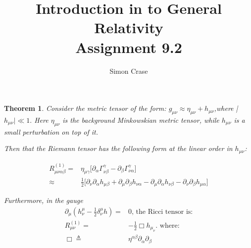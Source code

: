 \documentclass[]{article}
\title{Introduction in to General Relativity\\Assignment 9.2}
\author{Simon Crase}
\newtheorem{theorem}{Theorem}
\begin{document}
\maketitle


\begin{theorem}
Consider the metric tensor of the form: $g_{\mu\nu} \approx \eta_{\mu\nu} + h_{\mu\nu}$,where |$h_{\mu\nu}| \ll 1.$ Here $\eta_{\mu\nu}$ is the background Minkowskian metric tensor, while $h_{\mu\nu}$ is a small perturbation on top of it.

Then that the Riemann tensor has the following form at the linear order in $h_{\mu\nu}$:

\begin{align*}
R^{(1)}_{\mu\nu\alpha\beta} =& \eta_{\mu\gamma}\big[\partial_{\alpha}\Gamma^{\gamma}_{\nu\beta} - \partial_{\beta}\Gamma^{\gamma}_{\nu\alpha}\big]\\
\approx& \frac{1}{2}\big[\partial_{\nu}\partial_{\alpha}h_{\mu\beta} + \partial_{\mu}\partial_{\beta}h_{\nu\alpha} - \partial_{\mu}\partial_{\alpha}h_{\nu\beta} - \partial_{\nu}\partial_{\beta}h_{\mu\alpha}\big]
\end{align*}

Furthermore, in the gauge 
\begin{align*}
\partial_{\mu}(h^{\mu}_{\nu}-\frac{1}{2}\delta^{\mu}_{\nu}h)=&0\text{, the Ricci tensor is:}\\
R^{(1)}_{\mu\nu} =& - \frac{1}{2} \Box h_{\mu_{\nu}} \text{. where:}\\
\Box \triangleq & \eta^{\alpha\beta}\partial_{\alpha}\partial_{\beta}
\end{align*}
 

\end{theorem}
\end{document}
